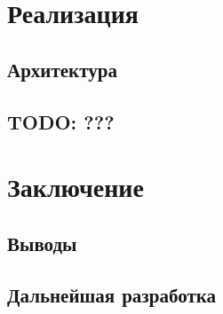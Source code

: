 \newpage
\section{Реализация}

\subsection{Архитектура}

\subsection{TODO: ???}

\newpage
\section{Заключение}

\subsection{Выводы}

\subsection{Дальнейшая разработка}
